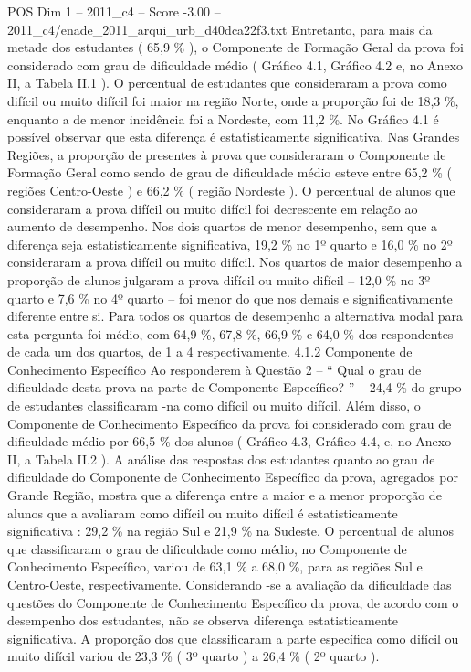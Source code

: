 \begin{textsample}{POS Dim 1 – 2011\_c4 – Score -3.00 – 2011\_c4/enade\_2011\_arqui\_urb\_d40dca22f3.txt}
Entretanto, para mais da metade dos estudantes ( 65,9 \% ), o Componente de Formação Geral da prova foi considerado com grau de dificuldade médio ( Gráfico 4.1, Gráfico 4.2 e, no Anexo II, a Tabela II.1 ).
O percentual de estudantes que consideraram a prova como difícil ou muito difícil foi maior na região Norte, onde a proporção foi de 18,3 \%, enquanto a de menor incidência foi a Nordeste, com 11,2 \%.
No Gráfico 4.1 é possível observar que esta diferença é estatisticamente significativa.
Nas Grandes Regiões, a proporção de presentes à prova que consideraram o Componente de Formação Geral como sendo de grau de dificuldade médio esteve entre 65,2 \% ( regiões Centro-Oeste ) e 66,2 \% ( região Nordeste ).
O percentual de alunos que consideraram a prova difícil ou muito difícil foi decrescente em relação ao aumento de desempenho.
Nos dois quartos de menor desempenho, sem que a diferença seja estatisticamente significativa, 19,2 \% no 1º quarto e 16,0 \% no 2º consideraram a prova difícil ou muito difícil.
Nos quartos de maior desempenho a proporção de alunos julgaram a prova difícil ou muito difícil – 12,0 \% no 3º quarto e 7,6 \% no 4º quarto – foi menor do que nos demais e significativamente diferente entre si.
Para todos os quartos de desempenho a alternativa modal para esta pergunta foi médio, com 64,9 \%, 67,8 \%, 66,9 \% e 64,0 \% dos respondentes de cada um dos quartos, de 1 a 4 respectivamente. 4.1.2 Componente de Conhecimento Específico Ao responderem à Questão 2 – “ Qual o grau de dificuldade desta prova na parte de Componente Específico? ” – 24,4 \% do grupo de estudantes classificaram -na como difícil ou muito difícil.
Além disso, o Componente de Conhecimento Específico da prova foi considerado com grau de dificuldade médio por 66,5 \% dos alunos ( Gráfico 4.3, Gráfico 4.4, e, no Anexo II, a Tabela II.2 ).
A análise das respostas dos estudantes quanto ao grau de dificuldade do Componente de Conhecimento Específico da prova, agregados por Grande Região, mostra que a diferença entre a maior e a menor proporção de alunos que a avaliaram como difícil ou muito difícil é estatisticamente significativa : 29,2 \% na região Sul e 21,9 \% na Sudeste.
O percentual de alunos que classificaram o grau de dificuldade como médio, no Componente de Conhecimento Específico, variou de 63,1 \% a 68,0 \%, para as regiões Sul e Centro-Oeste, respectivamente.
Considerando -se a avaliação da dificuldade das questões do Componente de Conhecimento Específico da prova, de acordo com o desempenho dos estudantes, não se observa diferença estatisticamente significativa.
A proporção dos que classificaram a parte específica como difícil ou muito difícil variou de 23,3 \% ( 3º quarto ) a 26,4 \% ( 2º quarto ).

\end{textsample}
